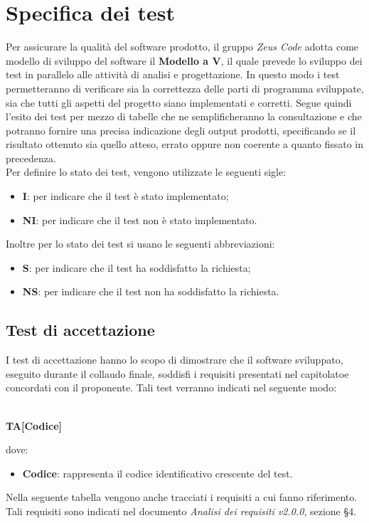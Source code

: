 \section{Specifica dei test}
Per assicurare la qualità del software prodotto, il gruppo \textit{Zeus Code} adotta come modello di sviluppo del software il
\textbf{Modello a V\glo}, il quale prevede lo sviluppo dei test in parallelo alle attività di analisi e progettazione. In questo modo i test permetteranno di verificare sia la correttezza delle parti di programma sviluppate, sia che tutti gli aspetti del progetto siano implementati e corretti. Segue quindi l'esito dei test per mezzo di tabelle che ne semplificheranno la consultazione e che potranno fornire una precisa indicazione degli output prodotti, specificando se il risultato ottenuto sia quello atteso, errato oppure non coerente a quanto fissato in precedenza. \\
Per definire lo stato dei test, vengono utilizzate le seguenti sigle:
\begin{itemize}
	\item \textbf{I}: per indicare che il test è stato implementato;
	\item \textbf{NI}: per indicare che il test non è stato implementato.
\end{itemize}
Inoltre per lo stato dei test si usano le seguenti abbreviazioni:
\begin{itemize}
	\item \textbf{S}: per indicare che il test ha soddisfatto la richiesta;
	\item \textbf{NS}: per indicare che il test non ha soddisfatto la richiesta.
\end{itemize}
\subsection{Test di accettazione}
I test di accettazione hanno lo scopo di dimostrare che il software sviluppato, eseguito durante il collaudo finale, soddisfi i requisiti presentati nel capitolato\glosp e concordati con il proponente. Tali test verranno indicati nel seguente modo: \\ \\
	\centerline{\textbf{TA[Codice]}}
dove:
\begin{itemize}
	\item \textbf{Codice}: rappresenta il codice identificativo crescente del test.
\end{itemize}
	Nella seguente tabella vengono anche tracciati i requisiti a cui fanno riferimento. Tali requisiti sono indicati nel documento \textit{Analisi dei requisiti v2.0.0}, sezione §4.
	\renewcommand{\arraystretch}{1.5}
	
